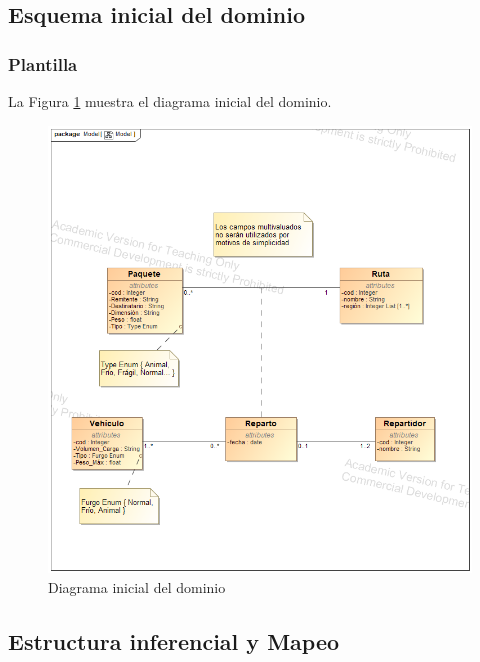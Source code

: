 \newpage

\subsection{Esquema inicial del dominio}

\subsubsection{Plantilla}
La Figura \ref{fig:DiagramaInicialDominio} muestra el diagrama inicial del dominio.

\begin{figure}[H]
  \centering
  \includegraphics[scale=0.50]{imaxes/DiagramaInicialDominio.png}
  \caption{\label{fig:DiagramaInicialDominio}Diagrama inicial del dominio}
\end{figure}

\subsection{Estructura inferencial y Mapeo}

